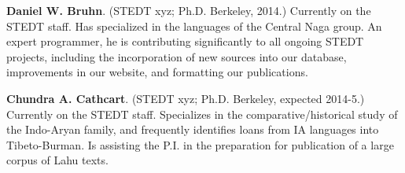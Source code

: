 \textbf{Daniel W. Bruhn}. (STEDT xyz; Ph.D. Berkeley, 2014.) Currently on the STEDT staff. Has specialized in the languages of the Central Naga group. An expert programmer, he is contributing significantly to all ongoing STEDT projects, including the incorporation of new sources into our database, improvements in our website, and formatting our publications.

\textbf{Chundra A. Cathcart}. (STEDT xyz; Ph.D. Berkeley, expected 2014-5.) Currently on the STEDT staff. Specializes in the comparative/historical study of the Indo-Aryan family, and frequently identifies loans from IA languages into Tibeto-Burman. Is assisting the P.I. in the preparation for publication of a large corpus of Lahu texts.
